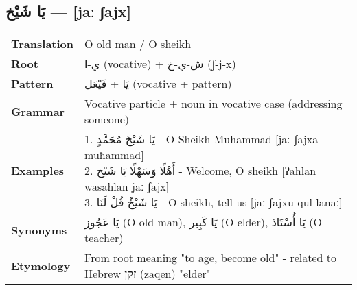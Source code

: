 \documentclass[letterpaper,12pt]{article}
\begin{document}
\subsection{\textarabic{يَا شَيْخ} — [jaː ʃajx]}

\begin{tabular}{p{3cm}p{10cm}}
\toprule
\textbf{Translation} & O old man / O sheikh \\
\textbf{Root} & \textarabic{ي-ا} (vocative) + \textarabic{ش-ي-خ} (ʃ-j-x) \\
\textbf{Pattern} & \textarabic{يَا} + \textarabic{فَيْعَل} (vocative + pattern) \\
\textbf{Grammar} & Vocative particle + noun in vocative case (addressing someone) \\
\textbf{Examples} & \makecell[l]{\parbox{9.5cm}{
1. \textarabic{يَا شَيْخَ مُحَمَّدٍ} - O Sheikh Muhammad [jaː ʃajxa muħammad]\\
2. \textarabic{أَهْلًا وَسَهْلًا يَا شَيْخ} - Welcome, O sheikh [ʔahlan wasahlan jaː ʃajx]\\
3. \textarabic{يَا شَيْخُ قُلْ لَنَا} - O sheikh, tell us [jaː ʃajxu qul lanaː]
}} \\
\midrule
\textbf{Synonyms} & \textarabic{يَا عَجُوز} (O old man), \textarabic{يَا كَبِير} (O elder), \textarabic{يَا أُسْتَاذ} (O teacher) \\
\textbf{Etymology} & From root meaning "to age, become old" - related to Hebrew \texthebrew{זקן} (zaqen) "elder" \\
\bottomrule
\end{tabular}

\end{document}
